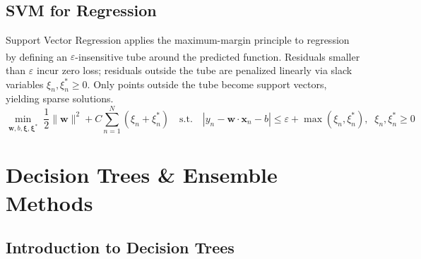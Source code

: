 \subsection{SVM for Regression}

\begin{tcbitemize}[ skin=sectionraster ]
    \tcbitem[title={Support Vector Regression (SVR) and the $\varepsilon$-Tube}, raster multicolumn=6]
    Support Vector Regression applies the maximum-margin principle to regression by defining an $\varepsilon$-insensitive tube around the predicted function\textsuperscript{\cite[][pp.~98--101]{iiiCourseMachineLearning}}. Residuals smaller than $\varepsilon$ incur zero loss; residuals outside the tube are penalized linearly via slack variables $\xi_n, \xi_n^* \geq 0$. Only points outside the tube become support vectors, yielding sparse solutions.
    \tcblower
    \begin{equation}
        \min_{\mathbf{w},b,\boldsymbol{\xi},\boldsymbol{\xi}^*}\; \frac{1}{2}\|\mathbf{w}\|^2 + C\sum_{n=1}^{N}(\xi_n + \xi_n^*)
        \quad\text{s.t.}\quad
        \left|y_n - \mathbf{w}\cdot\mathbf{x}_n - b\right| \leq \varepsilon + \max(\xi_n, \xi_n^*),\;\; \xi_n,\xi_n^* \geq 0
    \end{equation}
\end{tcbitemize}

\section{Decision Trees \& Ensemble Methods}

\subsection{Introduction to Decision Trees}

